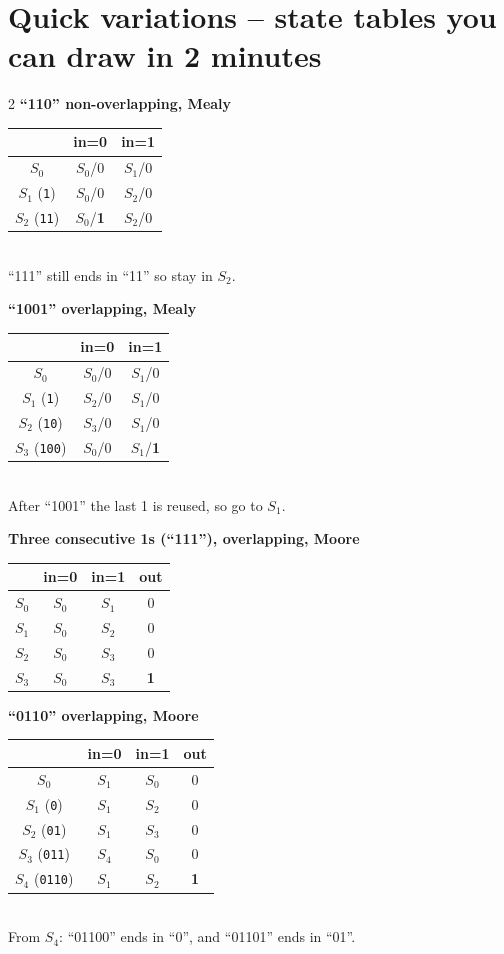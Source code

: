 \documentclass[10pt,a4paper]{article}
\begin{document}
\section{Quick variations -- state tables you can draw in 2 minutes}
\begin{multicols}{2}\small
\textbf{``110'' non-overlapping, Mealy}\\
\begin{tabular}{c c c}\toprule
 & in=0 & in=1\\\midrule
$S_0$ & $S_0$/0 & $S_1$/0\\
$S_1$ (\texttt{1}) & $S_0$/0 & $S_2$/0\\
$S_2$ (\texttt{11}) & \cellcolor{orange!20}$S_0$/\textbf{1} & $S_2$/0\\\bottomrule
\end{tabular}\\[2pt]
{\footnotesize ``111'' still ends in ``11'' so stay in $S_2$.}

\medskip
\textbf{``1001'' overlapping, Mealy}\\
\begin{tabular}{c c c}\toprule
 & in=0 & in=1\\\midrule
$S_0$ & $S_0$/0 & $S_1$/0\\
$S_1$ (\texttt{1}) & $S_2$/0 & $S_1$/0\\
$S_2$ (\texttt{10}) & $S_3$/0 & $S_1$/0\\
$S_3$ (\texttt{100}) & $S_0$/0 & \cellcolor{orange!20}$S_1$/\textbf{1}\\\bottomrule
\end{tabular}\\[2pt]
{\footnotesize After ``1001'' the last 1 is reused, so go to $S_1$.}

\medskip
\textbf{Three consecutive 1s (``111''), overlapping, Moore}\\
\begin{tabular}{c c c c}\toprule
 & in=0 & in=1 & out\\\midrule
$S_0$ & $S_0$ & $S_1$ & 0\\
$S_1$ & $S_0$ & $S_2$ & 0\\
$S_2$ & $S_0$ & $S_3$ & 0\\
$S_3$ & $S_0$ & $S_3$ & \textbf{1}\\\bottomrule
\end{tabular}

\columnbreak
\textbf{``0110'' overlapping, Moore}\\
\begin{tabular}{c c c c}\toprule
 & in=0 & in=1 & out\\\midrule
$S_0$ & $S_1$ & $S_0$ & 0\\
$S_1$ (\texttt{0}) & $S_1$ & $S_2$ & 0\\
$S_2$ (\texttt{01}) & $S_1$ & $S_3$ & 0\\
$S_3$ (\texttt{011}) & $S_4$ & $S_0$ & 0\\
$S_4$ (\texttt{0110}) & $S_1$ & $S_2$ & \textbf{1}\\\bottomrule
\end{tabular}\\[2pt]
{\footnotesize From $S_4$: ``01100'' ends in ``0'', and ``01101'' ends in ``01''.}


\end{multicols}
\end{document}

